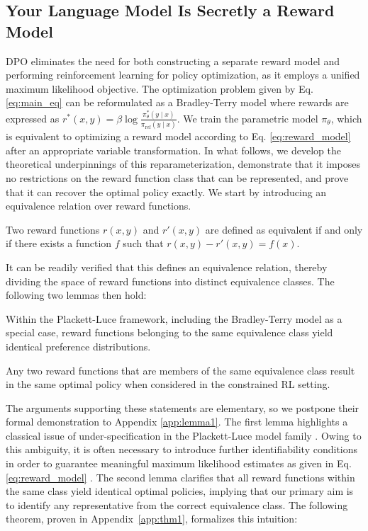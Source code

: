 \label{sec:theory}

\subsection{Your Language Model Is Secretly a Reward Model} DPO eliminates the need for both constructing a separate reward model and performing reinforcement learning for policy optimization, as it employs a unified maximum likelihood objective. The optimization problem given by Eq. \ref{eq:main_eq} can be reformulated as a Bradley-Terry model where rewards are expressed as $r^*(x, y) = \beta \log\frac{\pi^*_\theta(y \mid x)}{\pi_\text{ref}(y \mid x)}$. We train the parametric model $\pi_{\theta}$, which is equivalent to optimizing a reward model according to Eq. \ref{eq:reward_model} after an appropriate variable transformation. In what follows, we develop the theoretical underpinnings of this reparameterization, demonstrate that it imposes no restrictions on the reward function class that can be represented, and prove that it can recover the optimal policy exactly. We start by introducing an equivalence relation over reward functions.

\begin{definition}
Two reward functions $r(x, y)$ and $r'(x, y)$ are defined as equivalent if and only if there exists a function $f$ such that $r(x, y)-r'(x, y) = f(x)$.     
\end{definition}

It can be readily verified that this defines an equivalence relation, thereby dividing the space of reward functions into distinct equivalence classes. The following two lemmas then hold:

\begin{lemma}\label{lemma:same_prefrence} Within the Plackett-Luce framework, including the Bradley-Terry model as a special case, reward functions belonging to the same equivalence class yield identical preference distributions.
\end{lemma}

\begin{lemma}\label{lemma:same_policy}
    Any two reward functions that are members of the same equivalence class result in the same optimal policy when considered in the constrained RL setting.
\end{lemma}

The arguments supporting these statements are elementary, so we postpone their formal demonstration to Appendix \ref{app:lemma1}. The first lemma highlights a classical issue of under-specification in the Plackett-Luce model family \cite{plackett1975analysis}. Owing to this ambiguity, it is often necessary to introduce further identifiability conditions in order to guarantee meaningful maximum likelihood estimates as given in Eq. \ref{eq:reward_model} \cite{bong2022generalized}. The second lemma clarifies that all reward functions within the same class yield identical optimal policies, implying that our primary aim is to identify any representative from the correct equivalence class. The following theorem, proven in Appendix~\ref{app:thm1}, formalizes this intuition:

